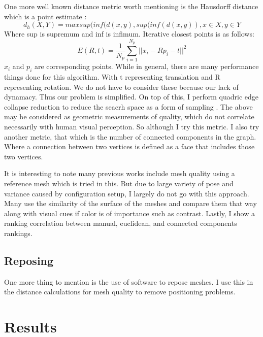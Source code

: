 One more well known distance metric worth mentioning is the Hausdorff distance which is a point estimate \cite{huttenlocher1993comparing}:
\begin{equation}
	d_h(X, Y) = max{sup(inf(d(x, y),sup(inf(d(x,y))}, x\in X, y\in Y
\end{equation}
Where sup is supremum and inf is infimum.
Iterative closest points is as follows:
\begin{equation}
	E(R, t) = \frac{1}{N_p}\sum_{i=1}^{N_p}||x_i - Rp_i - t||^2
\end{equation}
$x_i$ and $p_i$ are corresponding points.
While in general, there are many performance things done for this algorithm. With t representing translation and R representing rotation. We do not have to consider these because our lack of dynamacy. Thus our problem is simplified. On top of this, I perform quadric edge collapse reduction to reduce the seacrh space as a form of sampling \cite{hussain2004efficient}.
The above may be considered as geometric measurements of quality, which do not correlate necessarily with human visual perception. So although I try this metric. I also try another metric, that which is the number of connected components in the graph. Where a connection between two vertices is defined as a face that includes those two vertices.

It is interesting to note many previous works include mesh quality using a reference mesh which is tried in this. But due to large variety of pose and variance caused by configuration setup, I largely do not go with this approach. Many use the similarity of the surface of the meshes and compare them that way along with visual cues if color is of importance such as contrast. Lastly, I show a ranking correlation between manual, euclidean, and connected components rankings.

\section{Reposing}
One more thing to mention is the use of software to repose meshes. I use this in the distance calculations for mesh quality to remove positioning problems.
\chapter{Results}
